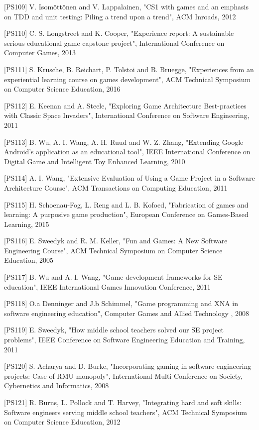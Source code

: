 [PS109]	V. Isomöttönen and V. Lappalainen, "CS1 with games and an emphasis on TDD and unit testing: Piling a trend upon a trend", ACM Inroads, 2012

[PS110]	C. S. Longstreet and K. Cooper, "Experience report: A sustainable serious educational game capstone project", International Conference on Computer Games, 2013

[PS111]	S. Krusche, B. Reichart, P. Tolstoi and B. Bruegge, "Experiences from an experiential learning course on games development", ACM Technical Symposium on Computer Science Education, 2016

[PS112]	E. Keenan and A. Steele, "Exploring Game Architecture Best-practices with Classic Space Invaders", International Conference on Software Engineering, 2011

[PS113]	B. Wu, A. I. Wang, A. H. Ruud and W. Z. Zhang, "Extending Google Android's application as an educational tool", IEEE International Conference on Digital Game and Intelligent Toy Enhanced Learning, 2010

[PS114]	A. I. Wang, "Extensive Evaluation of Using a Game Project in a Software Architecture Course", ACM Transactions on Computing Education, 2011

[PS115]	H. Schoenau-Fog, L. Reng and L. B. Kofoed, "Fabrication of games and learning: A purposive game production", European Conference on Games-Based Learning, 2015

[PS116]	E. Sweedyk and R. M. Keller, "Fun and Games: A New Software Engineering Course", ACM Technical Symposium on Computer Science Education, 2005

[PS117]	B. Wu and A. I. Wang, "Game development frameworks for SE education", IEEE International Games Innovation Conference, 2011

[PS118]	O.a Denninger and J.b Schimmel, "Game programming and XNA in software engineering education", Computer Games and Allied Technology , 2008

[PS119]	E. Sweedyk, "How middle school teachers solved our SE project problems", IEEE Conference on Software Engineering Education and Training, 2011

[PS120]	S. Acharya and D. Burke, "Incorporating gaming in software engineering projects: Case of RMU monopoly", International Multi-Conference on Society, Cybernetics and Informatics, 2008

[PS121]	R. Burns, L. Pollock and T. Harvey, "Integrating hard and soft skills: Software engineers serving middle school teachers", ACM Technical Symposium on Computer Science Education, 2012

